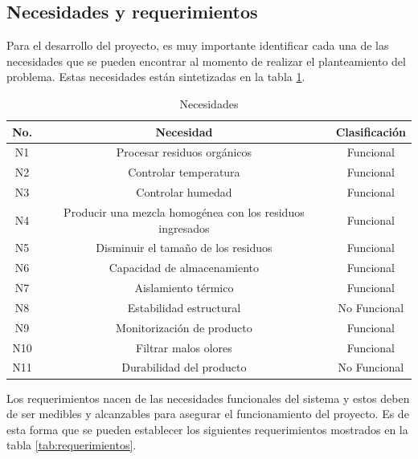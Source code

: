 \subsection{Necesidades y requerimientos}

Para el desarrollo del proyecto, es muy importante identificar cada una de las necesidades que se pueden encontrar al momento de realizar el planteamiento del problema. Estas necesidades están sintetizadas en la tabla \ref{tab:Necesidades}. 

\begin{table}[h]
  \centering
  \begin{tabular}{|c|c|c|}
    \hline
    No. & Necesidad & Clasificación \\
    \hline
    N1 & Procesar residuos orgánicos & Funcional \\
    N2 & Controlar temperatura & Funcional \\
    N3 & Controlar humedad & Funcional \\
    N4 & Producir una mezcla homogénea con los residuos ingresados & Funcional \\
    N5 & Disminuir el tamaño de los residuos & Funcional \\
    N6 & Capacidad de almacenamiento & Funcional \\
    N7 & Aislamiento térmico & Funcional \\
    N8 & Estabilidad estructural & No Funcional \\
    N9 & Monitorización de producto & Funcional \\
    N10 & Filtrar malos olores & Funcional \\
    N11 & Durabilidad del producto & No Funcional \\
    \hline
  \end{tabular}
  \caption{Necesidades}
  \label{tab:Necesidades}
\end{table}


Los requerimientos nacen de las necesidades funcionales del sistema y estos deben de ser medibles y alcanzables para asegurar el funcionamiento del proyecto. Es de esta forma que se pueden establecer los siguientes requerimientos mostrados en la tabla \ref{tab:requerimientos}.
\clearpage
    

